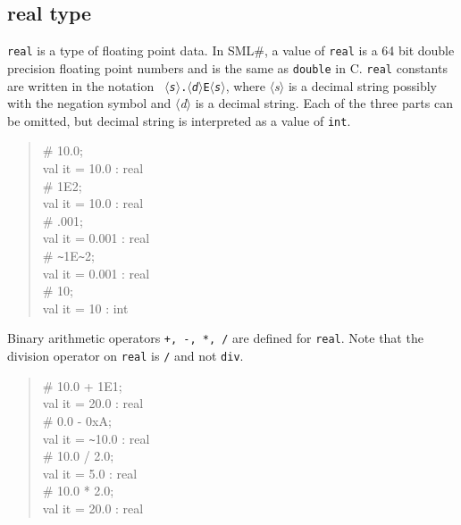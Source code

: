 \documentclass{jbook}
\newcommand{\smlsharp}{SML\#}
\newcommand{\code}[1]{\mbox{\large\tt #1}}
\newcommand{\nonterm}[1]{\mbox{$\langle$}{\it #1}\mbox{$\rangle$}}
\newenvironment{program}{\begin{quote}\begin{tt}}%
                        {\end{tt}\end{quote}}
\begin{document}
\subsection{real type}
	{\tt real} is a type of floating point data.
	In \smlsharp{}, a value of {\tt real} is a 64 bit double
precision floating point numbers and is the same as \code{double} in C.
	{\tt real} constants are written in the notation {\tt
\nonterm{s}.\nonterm{d}E\nonterm{s}}, where \nonterm{s} is a decimal
string possibly with the negation symbol and \nonterm{d} is a decimal
string.
	Each of the three parts can be omitted, but decimal string is
interpreted as a value of  {\tt int}.
\begin{program}
\# 10.0;\\
val it = 10.0 : real\\
\# 1E2;\\
val it = 10.0 : real\\
\# .001;\\
val it = 0.001 : real\\
\# \verb|~|1E\verb|~|2;\\
val it = 0.001 : real\\
\# 10;\\
val it = 10 : int
\end{program}
	Binary arithmetic operators {\tt +, -, *, /} are defined for {\tt real}.
	Note that the division operator on {\tt real} is {\tt /} and not
{\tt div}.
\begin{program}
\# 10.0 + 1E1;\\
val it = 20.0 : real\\
\# 0.0 - 0xA;\\
val it = \verb|~|10.0 : real\\
\# 10.0 / 2.0;\\
val it = 5.0 : real\\
\# 10.0 * 2.0;\\
val it = 20.0 : real
\end{program}
\end{document}
